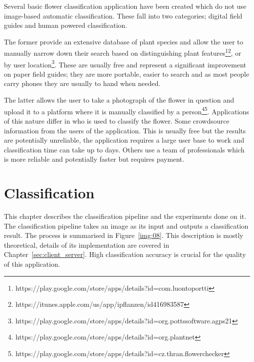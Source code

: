 \documentclass[11pt, a4paper]{report}
\begin{document}
Several basic flower classification application have been created which do not use image-based automatic classification. These fall into two categories; digital field guides and human powered classification.


The former provide an extensive database of plant species and allow the user to manually narrow down their search based on distinguishing plant features\footnote{https://play.google.com/store/apps/details?id=com.luontoportti}\footnote{https://itunes.apple.com/us/app/ipflanzen/id416983587}, or by user location\footnote{https://play.google.com/store/apps/details?id=org.pottssoftware.agps21}. These are usually free and represent a significant improvement on paper field guides; they are more portable, easier to search and as most people carry phones they are usually to hand when needed. 

The latter allows the user to take a photograph of the flower in question and upload it to a platform where it is manually classified by a person\footnote{https://play.google.com/store/apps/details?id=org.plantnet}\footnote{https://play.google.com/store/apps/details?id=cz.thran.flowerchecker}. Applications of this nature differ in who is used to classify the flower. Some crowdsource information from the users of the application. This is usually free but the results are potentially unreliable, the application requires a large user base to work and classification time can take up to days. Others use a team of professionals which is more reliable and potentially faster but requires payment.












\chapter{Classification}
\label{sec:classification}


This chapter describes the classification pipeline and the experiments done on it. The classification pipeline takes an image as its input and outputs a classification result. The process is summarised in Figure~\ref{img:08}. This description is mostly theoretical, details of its implementation are covered in Chapter~\ref{sec:client_server}. High classification accuracy is crucial for the quality of this application. 
\end{document}
